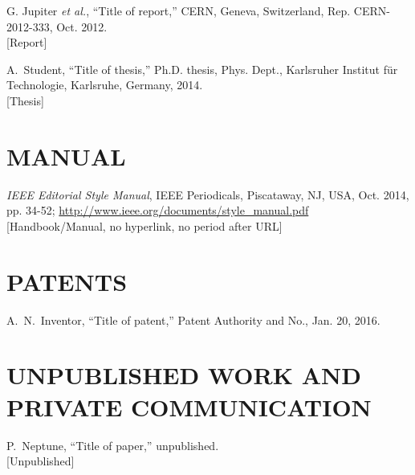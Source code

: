 \documentclass[letterpaper,  %
              ]{jacow-2_3}   %
\begin{document}
{{\begin{thebibliography}{99} %
	\setcounter{enumi}{14}
		G. Jupiter \emph{et al.}, 
		“Title of report,” CERN, Geneva, Switzerland,
		Rep. CERN-2012-333, Oct. 2012.\\
	\textcolor{jrept}{[Report]}

		A.~Student, “Title of thesis,”
		Ph.D. thesis, Phys. Dept.,
		Karlsruher Institut für Technologie, Karlsruhe, 
		Germany, 2014.\\
	\textcolor{jrept}{[Thesis]}
\end{thebibliography}

\newpage

\section{MANUAL}

\begin{thebibliography}{99} %
	\setcounter{enumi}{16}
		\emph{IEEE Editorial Style Manual}, 
		IEEE Periodicals, 
		Piscataway, NJ, USA, Oct. 2014, pp. 34-52; 
		\url{http://www.ieee.org/documents/style_manual.pdf} \\
	\textcolor{jmanu}{[Handbook/Manual, no hyperlink, no period after URL]}
\end{thebibliography}

\section{PATENTS}

\begin{thebibliography}{99} %
	\setcounter{enumi}{17}
		A.~N.~Inventor, 
		“Title of patent,”
		Patent Authority and No., Jan. 20, 2016.

\end{thebibliography}

\newpage

\section{UNPUBLISHED WORK AND PRIVATE COMMUNICATION}

\begin{thebibliography}{99} %
	\setcounter{enumi}{18}
		P.~Neptune, “Title of paper,” unpublished.\\
	\textcolor{junpu}{[Unpublished]}
	

\end{thebibliography}}}
\end{document}
